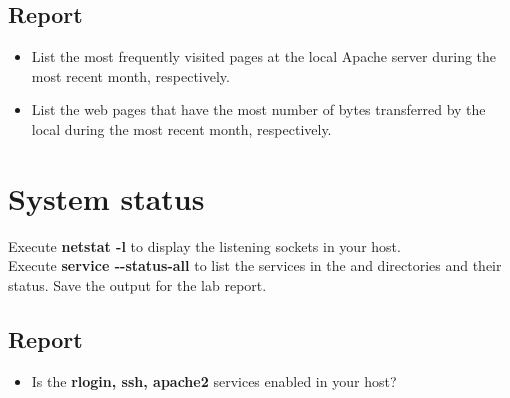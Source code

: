 \documentclass{../UTNetLab}
\begin{document}
	\subsection*{Report}
	\begin{itemize}
		\item List the most frequently visited pages at the local Apache server during the most recent month, respectively.
		\item List the web pages that have the most number of bytes transferred by the local during the most recent month, respectively.
	\end{itemize}

\section{System status}
	Execute \textbf{netstat -l} to display the listening sockets in your host.\\
	Execute \textbf{service -{}-status-all} to list the services in the  and  directories and their status. Save the output for the lab report.
	
	\subsection*{Report}
	\begin{itemize}
		\item Is the \textbf{rlogin, ssh, apache2} services enabled in your host?
	\end{itemize}
\end{document}
